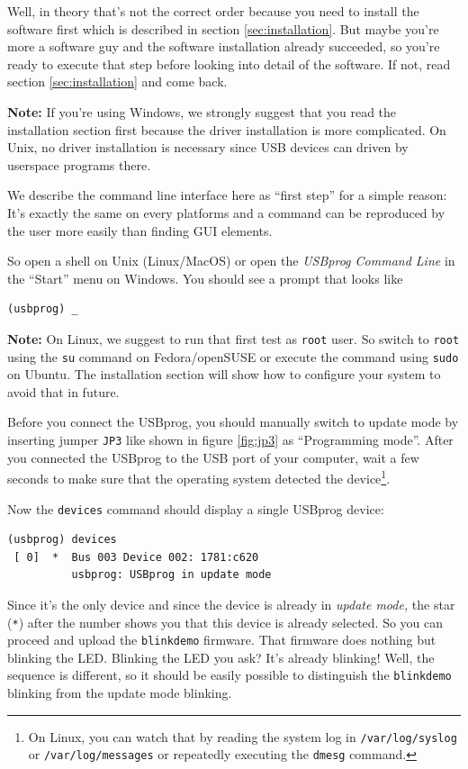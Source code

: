 \documentclass[bibtotoc,UKenglish,halfparskip,oneside,DIV12]{scrreprt}
\begin{document}
Well, in theory that's not the correct order because you need to install the software first which is
described in section \vref{sec:installation}. But maybe you're more a software guy and the software
installation already succeeded, so you're ready to execute that step before looking into detail of
the software. If not, read section \vref{sec:installation} and come back.

\textbf{Note:} If you're using Windows, we strongly suggest that you read the installation section
first because the driver installation is more complicated. On Unix, no driver installation is
necessary since USB devices can driven by userspace programs there.

We describe the command line interface here as ``first step'' for a simple reason: It's exactly the
same on every platforms and a command can be reproduced by the user more easily than finding GUI
elements.

So open a shell on Unix (Linux/MacOS) or open the \emph{USBprog Command Line} in the ``Start'' menu
on Windows. You should see a prompt that looks like

\begin{lstlisting}[style=inline]
(usbprog) _
\end{lstlisting}

\textbf{Note:} On Linux, we suggest to run that first test as \texttt{root} user. So switch to
\texttt{root} using the \texttt{su} command on Fedora/openSUSE or execute the command using
\texttt{sudo} on Ubuntu. The installation section will show how to configure your system to avoid
that in future.

Before you connect the USBprog, you should manually switch to update mode by inserting jumper
\texttt{JP3} like shown in figure \vref{fig:jp3} as ``Programming mode''. After you connected the
USBprog to the USB port of your computer, wait a few seconds to make sure that the operating system
detected the device\footnote{On Linux, you can watch that by reading the system log in
\texttt{/var/log/syslog} or \texttt{/var/log/messages} or repeatedly executing the \texttt{dmesg}
command.}.

Now the \texttt{devices} command should display a single USBprog device:

\begin{lstlisting}[style=inline]
(usbprog) devices
 [ 0]  *  Bus 003 Device 002: 1781:c620
          usbprog: USBprog in update mode
\end{lstlisting}

Since it's the only device and since the device is already in \emph{update mode,} the star
(\texttt{*}) after the number shows you that this device is already selected. So you can proceed and
upload the \texttt{blinkdemo} firmware. That firmware does nothing but blinking the LED. Blinking
the LED you ask? It's already blinking! Well, the sequence is different, so it should be easily
possible to distinguish the \texttt{blinkdemo} blinking from the update mode blinking.
\end{document}
